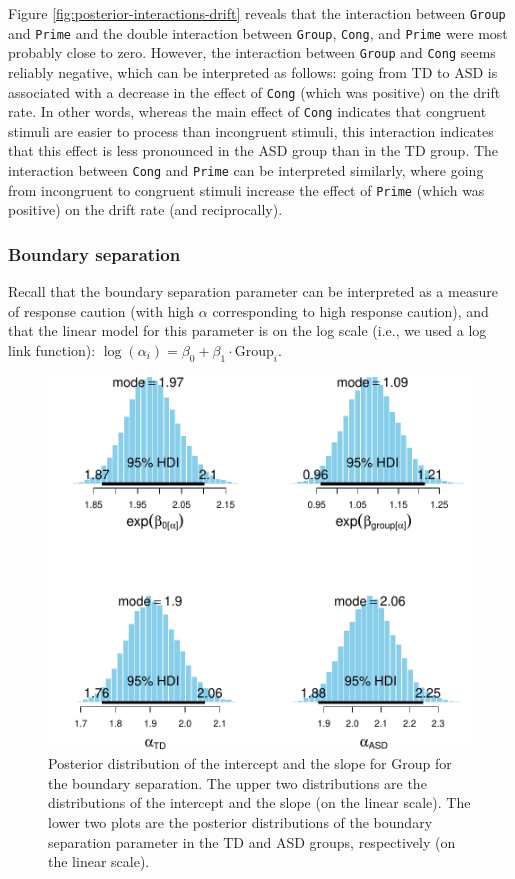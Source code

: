 \documentclass[
  11pt,
  english,
  ,doc,floatsintext]{apa6}
\begin{document}
Figure \ref{fig:posterior-interactions-drift} reveals that the interaction between \texttt{Group} and \texttt{Prime} and the double interaction between \texttt{Group}, \texttt{Cong}, and \texttt{Prime} were most probably close to zero. However, the interaction between \texttt{Group} and \texttt{Cong} seems reliably negative, which can be interpreted as follows: going from TD to ASD is associated with a decrease in the effect of \texttt{Cong} (which was positive) on the drift rate. In other words, whereas the main effect of \texttt{Cong} indicates that congruent stimuli are easier to process than incongruent stimuli, this interaction indicates that this effect is less pronounced in the ASD group than in the TD group. The interaction between \texttt{Cong} and \texttt{Prime} can be interpreted similarly, where going from incongruent to congruent stimuli increase the effect of \texttt{Prime} (which was positive) on the drift rate (and reciprocally).

\hypertarget{boundary-separation}{%
\subsubsection{Boundary separation}\label{boundary-separation}}

Recall that the boundary separation parameter can be interpreted as a measure of response caution (with high \(\alpha\) corresponding to high response caution), and that the linear model for this parameter is on the log scale (i.e., we used a log link function): \(\log(\alpha_{i}) = \beta_{0} + \beta_{1} \cdot \text{Group}_{i}\).

\begin{figure}[!htb]

{\centering \includegraphics[width=0.75\linewidth]{supplementary_materials_files/figure-latex/posterior-bs-1} 

}

\caption{Posterior distribution of the intercept and the slope for Group for the boundary separation. The upper two distributions are the distributions of the intercept and the slope (on the linear scale). The lower two plots are the posterior distributions of the boundary separation parameter in the TD and ASD groups, respectively (on the linear scale).}\label{fig:posterior-bs}
\end{figure}
\end{document}
